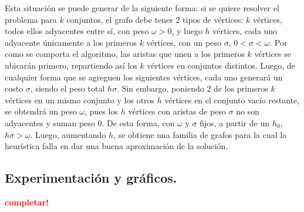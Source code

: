 Esta situación se puede generar de la siguiente forma: si se quiere resolver el
problema para $k$ conjuntos, el grafo debe tener 2 tipos de vértices: $k$
vértices, todos ellos adyacentes entre sí, con peso $\omega > 0$, y luego $h$
vértices, cada uno adyacente únicamente a los primeros $k$ vértices, con un
peso $\sigma$, $0 < \sigma < \omega$.  Por como se comporta el algoritmo, las
aristas que unen a los primeros $k$ vértices se ubicarán primero, repartiendo
así los $k$ vértices en conjuntos distintos. Luego, de cualquier forma que se
agreguen los siguientes vértices, cada uno generará un costo $\sigma$, siendo
el peso total $h \sigma$. Sin embargo, poniendo 2 de los primeros $k$ vértices
en un mismo conjunto y los otros $h$ vértices en el conjunto vacío restante,
se obtendrá un peso $\omega$, pues los $h$ vértices con aristas de peso
$\sigma$ no son adyacentes y suman peso $0$. De esta forma, con $\omega$ y
$\sigma$ fijos, a partir de un $h_0$, $h \sigma > \omega$. Luego, aumentando
$h$, se obtiene una familia de grafos para la cual la heurística falla en dar
una buena aproximación de la solución.


\newpage \subsection{Experimentación y gráficos.}
\vspace*{0.3cm}

\textcolor{red}{\textbf{completar!}}
